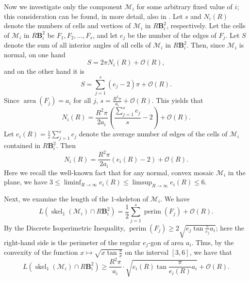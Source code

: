 \documentclass[twoside]{amsart}
\theoremstyle{definition}
\newcommand{\BB}{\mathbf B}
\newcommand{\M}{\mathcal{M}}
\DeclareMathOperator{\perim}{perim}
\DeclareMathOperator{\area}{area}
\DeclareMathOperator{\skel}{skel}
\begin{document}
Now we investigate only the component $\M_i$ for some arbitrary fixed value of $i$; this consideration can be found, in more detail, also in \cite{LW2025}.
Let $s$ and $N_i(R)$ denote the numbers of cells and vertices of $\M_i$ in $R \BB^2_i$, respectively. Let the cells of $\M_i$ in $R \BB^2_i$ be $F_1, F_2, \ldots, F_s$, and let $e_j$ be the number of the edges of $F_j$. Let $S$ denote the sum of all interior angles of all cells of $\M_i$ in $R \BB^2_i$. Then, since $\M_i$ is normal, on one hand
\[
S = 2 \pi N_i(R) + \mathcal{O}(R),
\]
and on the other hand it is
\[
S=\sum_{j=1}^s (e_j-2) \pi + \mathcal{O}(R).
\]
Since $\area(F_j)=a_i$ for all $j$, $s = \frac{R^2 \pi}{a_i} + \mathcal{O}(R)$. This yields that
\[
N_i(R) = \frac{R^2 \pi}{2 a_i} \left( \frac{\sum_{j=1}^s e_j}{s} - 2 \right) + \mathcal{O}(R).
\]
Let $e_i(R) = \frac{1}{s} \sum_{j=1}^s e_j$ denote the average number of edges of the cells of $\M_i$ contained in $R \BB_i^2$. Then
\begin{equation}\label{eq:Ni}
N_i(R) = \frac{R^2 \pi }{2 a_i} \left( e_i(R) - 2 \right) + \mathcal{O}(R).
\end{equation}
Here we recall the well-known fact that for any normal, convex mosaic $\M_i$ in the plane, we have $3 \leq \liminf_{R \to \infty} e_i(R) \leq \limsup_{R \to \infty} e_i(R) \leq 6$.

Next, we examine the length of the $1$-skeleton of $\M_i$. We have
\[
L(\skel_1(\M_i) \cap R \BB^2_i) = \frac{1}{2} \sum_{j=1}^s \perim(F_j) + \mathcal{O}(R).
\]
By the Discrete Isoperimetric Inequality, $\perim(F_j) \geq 2 \sqrt{ e_j \tan \frac{\pi}{e_j} a_i}$; here the right-hand side is the perimeter of the regular $e_j$-gon of area $a_i$. Thus, by the convexity of the function $x \mapsto \sqrt{ x \tan \frac{\pi}{x}}$ on the interval $[3,6]$, we have that
\begin{equation}\label{eq:skeli}
L(\skel_1(\M_i) \cap R \BB^2_i) \geq \frac{R^2 \pi}{a_i} \cdot \sqrt{ e_i(R) \tan \frac{\pi}{e_i(R)} a_i} + \mathcal{O}(R).
\end{equation}
\end{document}
